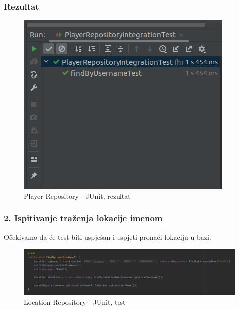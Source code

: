 				\subsubsection{Rezultat}
						
						\begin{figure}[H]
							\includegraphics[width=\textwidth]{slike/playerFindByUsernameTest_result} 
							\centering
							\caption{Player Repository - JUnit, rezultat}
							\label{}
						\end{figure}
					
				\subsubsection {2. Ispitivanje traženja lokacije imenom}
				
					{Očekivamo da će test biti uspješan i uspjeti pronaći lokaciju u bazi.}
				
						\begin{figure}[H]
							\includegraphics[width=\textwidth]{slike/locationFindByNameTest} 
							\centering
							\caption{Location Repository - JUnit, test}
							\label{}
						\end{figure}
					
